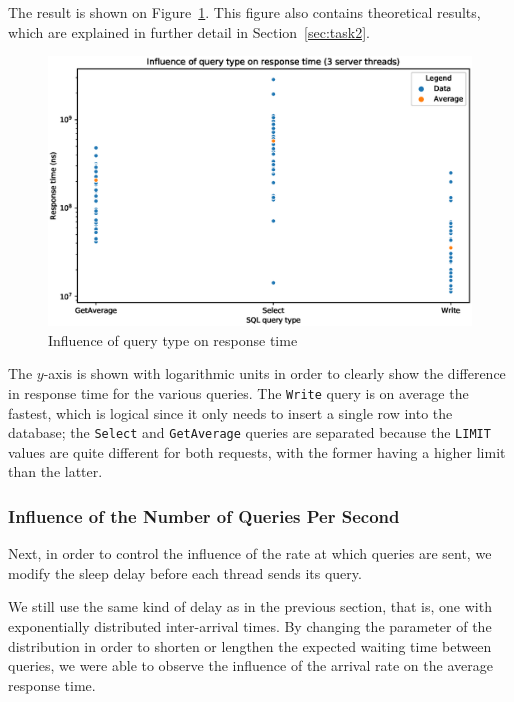 \documentclass[journal]{IEEEtran}
\theoremstyle{definition}
\newcommand{\java}[1]{\texttt{#1}}
\newcommand{\sql}[1]{\texttt{#1}}
\begin{document}
The result is shown on Figure~\ref{fig:query_influence}.
This figure also contains theoretical results, which are explained in further detail in Section~\ref{sec:task2}.
\begin{figure}[!hbtp]
	\centering
	\includegraphics[width=\columnwidth]{../plotting/query_influence}
	\caption{Influence of query type on response time}
	\label{fig:query_influence}
\end{figure}
The \(y\)-axis is shown with logarithmic units in order to clearly show the difference in response time for the various queries.
The \java{Write} query is on average the fastest, which is logical since it only needs to insert a single row into the database; the \java{Select} and \java{GetAverage} queries are separated because the \sql{LIMIT} values are quite different for both requests, with the former having a higher limit than the latter.

\subsubsection{Influence of the Number of Queries Per Second}
Next, in order to control the influence of the rate at which queries are sent, we modify the sleep delay before each thread sends its query.

We still use the same kind of delay as in the previous section, that is, one with exponentially distributed inter-arrival times.
By changing the parameter of the distribution in order to shorten or lengthen the expected waiting time between queries, we were able to observe the influence of the arrival rate on the average response time.
\end{document}
